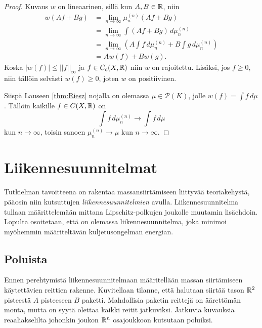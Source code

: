 \documentclass[12pt,oneside,a4paper]{amsbook} %
\begin{document}
\begin{proof}
    Kuvaus $w$ on lineaarinen, sillä kun $A, B \in \mathbb{R}$, niin
    \begin{align*}
        w(A f + B g) &= \lim_{n \to \infty} \mu_n^{(n)}(A f + B g) \\
        &=\lim_{n \to \infty} \int (A f + B g) \, d\mu_n^{(n)} \\
        &=\lim_{n \to \infty}  \left(A \int f \, d\mu_n^{(n)} + B \int g \, d\mu_n^{(n)}\right)  \\
        &= A w(f) + B w(g).
    \end{align*}
    Koska $|w(f)| \le ||f||_\infty$ ja $f \in C_c(X, \mathbb{R})$ niin $w$ on rajoitettu. Lisäksi, jos $f \ge 0$, niin tällöin selvästi $w(f) \ge 0$, joten $w$ on positiivinen.


    Siispä Lauseen \ref{thm:Riesz} nojalla on olemassa $\mu \in \mathcal P(K)$, jolle $w(f) = \int f \, d\mu$. Tällöin kaikille $f \in C(X, \mathbb{R})$ on
    \begin{equation*}
        \int f \, d\mu_n^{(n)} \to \int f \, d\mu
    \end{equation*}
    kun $n \to \infty$, toisin sanoen $\mu_n^{(n)} \to \mu$ kun $n \to \infty$.
\end{proof}

\chapter{Liikennesuunnitelmat}

Tutkielman tavoitteena on rakentaa massansiirtämiseen liittyvää teoriakehystä, pääosin niin kutsuttujen \textit{liikennesuunnitelmien} avulla. Liikennesuunnitelma tullaan määrittelemään mittana Lipschitz-polkujen joukolle muutamin lisäehdoin. Lopulta osoitetaan, että on olemassa liikennesuunnitelma, joka minimoi myöhemmin määriteltävän kuljetusongelman energian.

\section{Poluista}
Ennen perehtymistä liikennesuunnitelmaan määritellään massan siirtämiseen käytettävien reittien rakenne. Kuvitellaan tilanne, että halutaan siirtää tason $\mathbb{R}^2$ pisteestä $A$ pisteeseen $B$ paketti. Mahdollisia paketin reittejä on äärettömän monta, mutta on syytä olettaa kaikki reitit jatkuviksi. Jatkuvia kuvauksia reaaliakselilta johonkin joukon $\mathbb{R}^n$ osajoukkoon kutsutaan poluiksi. 
\end{document}
